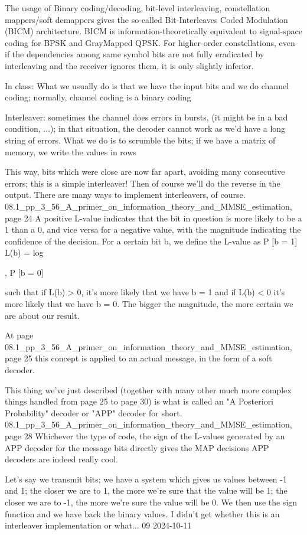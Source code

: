 {The usage of Binary coding/decoding, bit-level interleaving, constellation mappers/soft demappers gives the so-called Bit-Interleaves Coded Modulation (BICM) architecture.
BICM is information-theoretically equivalent to signal-space coding for BPSK and GrayMapped QPSK. For higher-order constellations, even if the dependencies among same symbol bits are not fully eradicated by interleaving and the receiver ignores them, it is only slightly inferior.

In class:
What we usually do is that we have the input bits and we do channel coding; normally,
channel coding is a binary coding

Interleaver: sometimes the channel does errors in bursts, (it might be in a bad condition, ...); in that situation, the decoder cannot work as we'd have a long string of errors.
What we do is to scrumble the bits; if we have a matrix of memory, we write the values in rows

This way, bits which were close are now far apart, avoiding many consecutive errors;
this is a simple interleaver!
Then of course we'll do the reverse in the output.
There are many ways to implement interleavers, of course.
08.1_pp_3_56_A_primer_on_information_theory_and_MMSE_estimation, page 24 A positive L-value indicates that the bit in question is more likely to be a 1 than a 0, and vice versa for a negative value, with the magnitude indicating the confidence of the decision.
For a certain bit b, we define the L-value as P [b = 1]
L(b) = log

,
P [b = 0]

such that if L(b) > 0, it's more likely that we have b = 1 and if L(b) < 0 it's more likely that we have b = 0.
The bigger the magnitude, the more certain we are about our result.

At page 08.1_pp_3_56_A_primer_on_information_theory_and_MMSE_estimation, page 25 this concept is applied to an actual message, in the form of a soft decoder.

This thing we've just described (together with many other much more complex things handled from page 25 to page 30) is what is called an "A Posteriori Probability" decoder or "APP" decoder for short.
08.1_pp_3_56_A_primer_on_information_theory_and_MMSE_estimation, page 28 Whichever the type of code, the sign of the L-values generated by an APP decoder for the message bits directly gives the MAP decisions APP decoders are indeed really cool.

Let's say we transmit bits; we have a system which gives us values between -1 and 1;
the closer we are to 1, the more we're sure that the value will be 1; the closer we are to -1, the more we're sure the value will be 0.
We then use the sign function and we have back the binary values.
I didn't get whether this is an interleaver implementation or what...
09 2024-10-11

}

